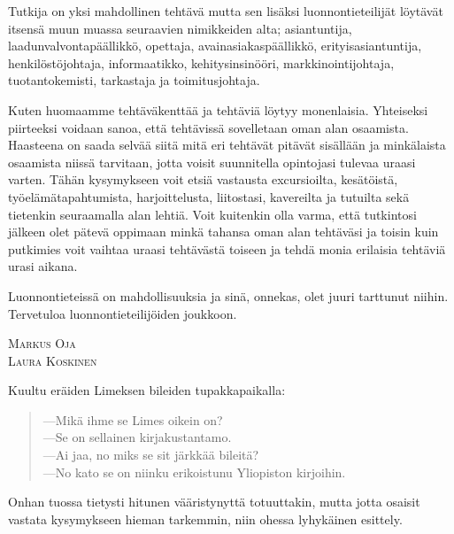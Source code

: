 \documentclass[a5paper, 8pt, twocolumn]{book} %
\numberwithin{equation}{section}
\begin{document}
Tutkija on yksi mahdollinen tehtävä mutta sen lisäksi luonnontieteilijät löytävät
itsensä muun muassa seuraavien nimikkeiden
alta; asiantuntija, laadunvalvontapäällikkö,
opettaja, avainasiakaspäällikkö,
erityisasiantuntija, henkilöstöjohtaja, informaatikko,
kehitysinsinööri, markkinointijohtaja,
tuotantokemisti, tarkastaja ja toimitusjohtaja.

Kuten huomaamme tehtäväkenttää ja
tehtäviä löytyy monenlaisia. Yhteiseksi
piirteeksi voidaan sanoa, että tehtävissä sovelletaan
oman alan osaamista. Haasteena
on saada selvää siitä mitä eri tehtävät pitävät
sisällään ja minkälaista osaamista niissä
tarvitaan, jotta voisit suunnitella opintojasi
tulevaa uraasi varten. Tähän kysymykseen
voit etsiä vastausta excursioilta, kesätöistä,
työelämätapahtumista, harjoittelusta, liitostasi,
kavereilta ja tutuilta sekä tietenkin
seuraamalla alan lehtiä. Voit kuitenkin olla
varma, että tutkintosi jälkeen olet pätevä
oppimaan minkä tahansa oman alan tehtäväsi
ja toisin kuin putkimies voit vaihtaa
uraasi tehtävästä toiseen ja tehdä monia erilaisia
tehtäviä urasi aikana.

Luonnontieteissä on mahdollisuuksia
ja sinä, onnekas, olet juuri tarttunut niihin.
Tervetuloa luonnontieteilijöiden joukkoon.

\vspace{0.5cm}\noindent
\textsc{Markus Oja}\\
\textsc{Laura Koskinen}

Kuultu eräiden Limeksen bileiden tupakka\-paikalla:
\begin{quotation}
\noindent---Mikä ihme se Limes oikein on?\\
---Se on sellainen kirjakustantamo.\\
---Ai jaa, no miks se sit järkkää bileitä?\\
---No kato se on niinku erikoistunu Yliopiston
kirjoihin.
\end{quotation}
Onhan tuossa tietysti hitunen vääristynyttä
totuuttakin, mutta jotta osaisit vastata
kysymykseen hieman tarkemmin, niin
ohessa lyhykäinen esittely.
\end{document}
